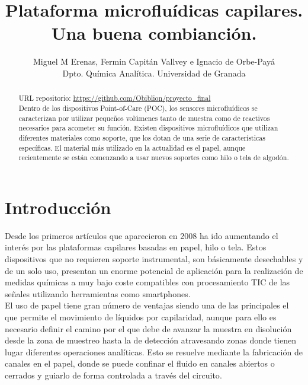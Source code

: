 \documentclass{article}
\title{Plataforma microfluídicas capilares.\\Una buena combianción.}
\author {Miguel M Erenas, Fermin Capitán Vallvey e Ignacio de Orbe-Payá\\
Dpto. Química Analítica. Universidad de Granada}
\begin{document}
	\maketitle
\begin{abstract}
URL repositorio: \url{https://github.com/Obiblion/proyecto_final}\\
Dentro de los dispositivos Point-of-Care (POC), los sensores microfluídicos se caracterizan por utilizar pequeños volúmenes tanto de muestra como de reactivos necesarios para acometer su función. Existen dispositivos microfluídicos que utilizan diferentes materiales como soporte, que los dotan de una serie de características específicas. El material más utilizado en la actualidad es el papel, aunque recientemente se están comenzando a usar nuevos soportes como hilo o tela de algodón.  
\end{abstract}



	
\section{Introducción}
Desde los primeros artículos que aparecieron en 2008\cite{Abe2008,Martinez2010} ha ido aumentando el interés por las plataformas capilares basadas en papel, hilo o tela. Estos dispositivos que no requieren soporte instrumental, son básicamente desechables y de un solo uso, presentan un enorme potencial de aplicación para la realización de medidas químicas a muy bajo coste compatibles con procesamiento TIC de las señales utilizando herramientas como smartphones.\\
 
El uso de papel tiene gran número de ventajas siendo una de las principales el que permite el movimiento de líquidos por capilaridad\cite{Cate2015}, aunque para ello es necesario definir el camino por el que debe de avanzar la muestra en disolución desde la zona de muestreo hasta la de detección atravesando zonas donde tienen lugar diferentes operaciones analíticas. Esto se resuelve mediante la fabricación de canales en el papel, donde se puede confinar el fluido en canales abiertos o cerrados y guiarlo de forma controlada a través del circuito\cite{Fenton2009}.\\
 
\end{document}
